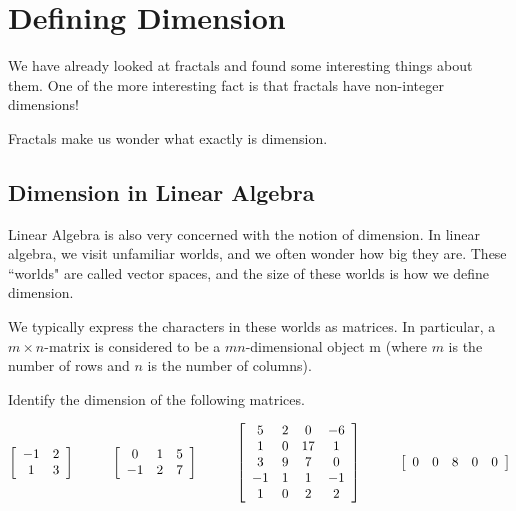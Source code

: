
\section{Defining Dimension}

We have already looked at fractals and found some interesting things about them. One of the more interesting fact is that fractals have non-integer dimensions!

\noindent Fractals make us wonder what exactly is dimension.

\subsection{Dimension in Linear Algebra}

Linear Algebra is also very concerned with the notion of dimension. In linear algebra, we visit unfamiliar worlds, and we often wonder how big they are. These ``worlds" are called vector spaces, and the size of these worlds is how we define dimension.

\noindent We typically express the characters in these worlds as matrices. In particular, a $m \times n$-matrix is considered to be a $mn$-dimensional object m (where $m$ is the number of rows and $n$ is the number of columns).

\begin{exercise}
Identify the dimension of the following matrices.
\end{exercise}

\[ \left[\begin{array}{cc}
-1 & 2 \\
1 & 3
\end{array}\right] \hspace{.4in} \left[\begin{array}{ccc}
0 & 1 & 5 \\
-1 & 2 & 7
\end{array}\right] \hspace{.4in} \left[\begin{array}{cccc}
5 & 2 & 0 & -6 \\
1 & 0 & 17 & 1 \\
3 & 9 & 7 & 0 \\
-1 & 1 & 1 & -1 \\
1 & 0 & 2 & 2
\end{array}\right] \hspace{.4in} \left[\begin{array}{ccccc}
0 & 0 & 8 & 0 & 0
\end{array}\right]  \]

\vspace{2in}
